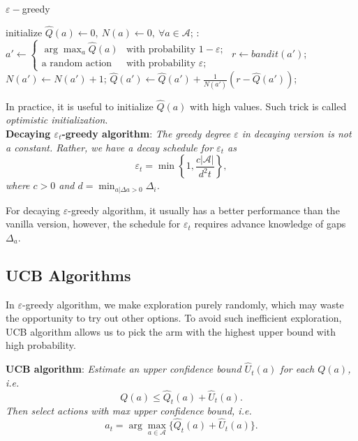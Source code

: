 \documentclass{progartcn}
\begin{document}
	 	\begin{algorithm}[H]
		\caption{$\varepsilon-$greedy}
		\label{alg: eps}
		\begin{algorithmic}[1]
			\State initialize $\hat{Q}(a)\gets 0,\ N(a)\gets0,\ \forall a\in\mathcal{A}$;
			:
				\State $a'\gets\begin{cases}\arg\max_{a} \hat{Q}(a) & \text{with probability }1-\varepsilon;\\\text{a random action} & \text{with probability }\varepsilon;\end{cases}$
				\State $r\gets bandit(a')$;
				\State $N(a')\gets N(a')+1$;
				\State $\hat{Q}(a')\gets \hat{Q}(a')+\frac{1}{N(a')}(r-\hat{Q}(a'))$;
        	\EndFor
		\end{algorithmic}
		\end{algorithm}

		In practice, it is useful to initialize $\hat{Q}(a)$ with high values. Such trick is called \textit{optimistic initialization}.\\

        \textbf{Decaying $\varepsilon_t$-greedy algorithm}: \textit{The greedy degree $\varepsilon$ in decaying version is not a constant. Rather, we have a decay schedule for $\varepsilon_t$ as}
        \[\varepsilon_t=\min\left\{1,\frac{c|\mathcal{A}|}{d^2t}\right\},\]
        \textit{where $c>0$ and $d=\min_{a|\Delta a>0}\Delta_i$.}

        For decaying $\varepsilon$-greedy algorithm, it usually has a better performance than the vanilla version, however, the schedule for $\varepsilon_t$ requires advance knowledge of gaps $\Delta_a$.\\

    \subsection{UCB Algorithms}

		In $\varepsilon$-greedy algorithm, we make exploration purely randomly, which may waste the opportunity to try out other options. To avoid such inefficient exploration, UCB algorithm allows us to pick the arm with the highest upper bound with high probability. 

    	\textbf{UCB algorithm}: \textit{Estimate an upper confidence bound $\hat{U}_t(a)$ for each $Q(a)$, i.e.}
    	\[Q(a)\le \hat{Q}_t(a)+\hat{U}_t(a).\]
    	\textit{Then select actions with max upper confidence bound, i.e.}
    	\[a_t=\arg\max_{a\in \mathcal{A}}\{\hat{Q}_t(a)+\hat{U}_t(a)\}.\]
\end{document}
